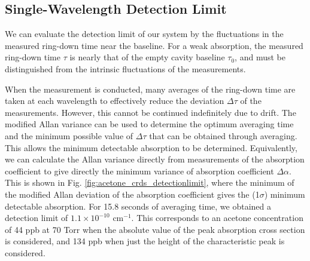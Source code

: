 \documentclass[8pt,a4paper]{report}
\begin{document}
	\subsection{Single-Wavelength Detection Limit} \label{sec:acetone_det_limit}
	We can evaluate the detection limit of our system by the fluctuations in the measured ring-down time \cite{allan_variance_mod} near the baseline. For a weak absorption, the measured ring-down time $\tau$ is nearly that of the empty cavity baseline $\tau_0$, and must be distinguished from the intrinsic fluctuations of the measurements.
	
	When the measurement is conducted, many averages of the ring-down time are taken at each wavelength to effectively reduce the deviation $\Delta \tau$ of the measurements. However, this cannot be continued indefinitely due to drift. The modified Allan variance \cite{allan_variance_mod} can be used to determine the optimum averaging time and the minimum possible value of $\Delta \tau$ that can be obtained through averaging. This allows the minimum detectable absorption to be determined. Equivalently, we can calculate the Allan variance directly from measurements of the absorption coefficient to give directly the minimum variance of absorption coefficient $\Delta \alpha$. This is shown in Fig. \ref{fig:acetone_crds_detectionlimit}, where the minimum of the modified Allan deviation of the absorption coefficient gives the (1$\sigma$) minimum detectable absorption. For 15.8 seconds of averaging time, we obtained a detection limit of $1.1\times 10^{-10}$ cm$^{-1}$. This corresponds to an acetone concentration of 44 ppb at 70 Torr when the absolute value of the peak absorption cross section is considered, and 134 ppb when just the height of the characteristic peak is considered.
	
\end{document}
